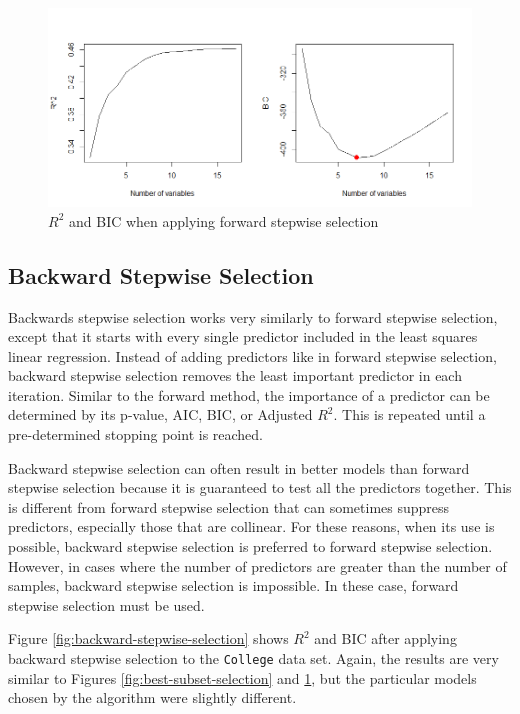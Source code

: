 \documentclass{article}
\begin{document}
\begin{figure}[!h]
	\centering
	\caption{$R^2$ and BIC when applying forward stepwise selection}
	\label{fig:forward-stepwise-selection}
	\includegraphics[width = 6in]{forward-stepwise-selection.png}
\end{figure}

\subsection{Backward Stepwise Selection}
Backwards stepwise selection works very similarly to forward stepwise selection, except that it starts with every single predictor included in the least squares linear regression. Instead of adding predictors like in forward stepwise selection, backward stepwise selection removes the least important predictor in each iteration. Similar to the forward method, the importance of a predictor can be determined by its p-value, AIC, BIC, or Adjusted $R^2$. This is repeated until a pre-determined stopping point is reached.

Backward stepwise selection can often result in better models than forward stepwise selection because it is guaranteed to test all the predictors together. This is different from forward stepwise selection that can sometimes suppress predictors, especially those that are collinear. For these reasons, when its use is possible, backward stepwise selection is preferred to forward stepwise selection. However, in cases where the number of predictors are greater than the number of samples, backward stepwise selection is impossible. In these case, forward stepwise selection must be used.

Figure \ref{fig:backward-stepwise-selection} shows $R^2$ and BIC after applying backward stepwise selection to the \lstinline!College! data set. Again, the results are very similar to Figures \ref{fig:best-subset-selection} and \ref{fig:forward-stepwise-selection}, but the particular models chosen by the algorithm were slightly different. 
\end{document}
